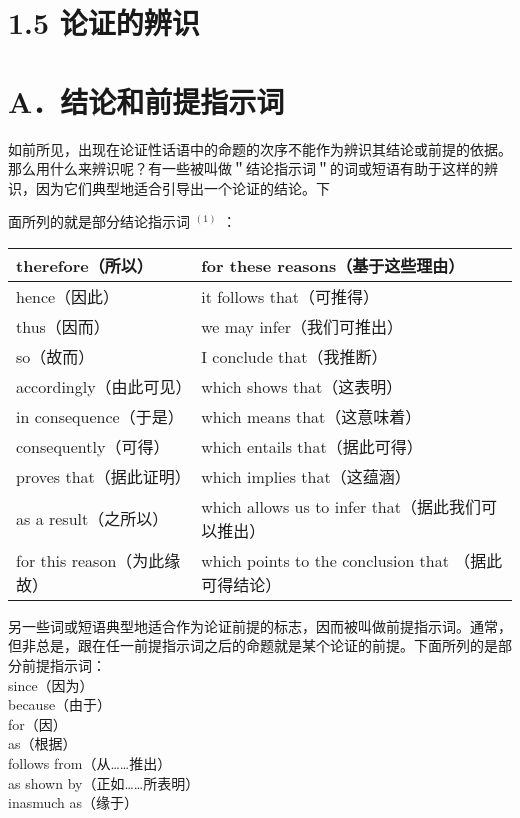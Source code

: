 \section*{1.5 论证的辨识}
\section*{A．结论和前提指示词}
如前所见，出现在论证性话语中的命题的次序不能作为辨识其结论或前提的依据。那么用什么来辨识呢？有一些被叫做＂结论指示词＂的词或短语有助于这样的辨识，因为它们典型地适合引导出一个论证的结论。下

面所列的就是部分结论指示词 ${ }^{(1)}$ ：

\begin{center}
\begin{tabular}{|l|l|}
\hline
therefore（所以） & for these reasons（基于这些理由） \\
\hline
hence（因此） & it follows that（可推得） \\
\hline
thus（因而） & we may infer（我们可推出） \\
\hline
so（故而） & I conclude that（我推断） \\
\hline
accordingly（由此可见） & which shows that（这表明） \\
\hline
in consequence（于是） & which means that（这意味着） \\
\hline
consequently（可得） & which entails that（据此可得） \\
\hline
proves that（据此证明） & which implies that（这蕴涵） \\
\hline
as a result（之所以） & which allows us to infer that（据此我们可以推出） \\
\hline
for this reason（为此缘故） & which points to the conclusion that （据此可得结论） \\
\hline
\end{tabular}
\end{center}

另一些词或短语典型地适合作为论证前提的标志，因而被叫做前提指示词。通常，但非总是，跟在任一前提指示词之后的命题就是某个论证的前提。下面所列的是部分前提指示词：\\
since（因为）\\
because（由于）\\
for（因）\\
as（根据）\\
follows from（从……推出）\\
as shown by（正如……所表明）\\
inasmuch as（缘于）

